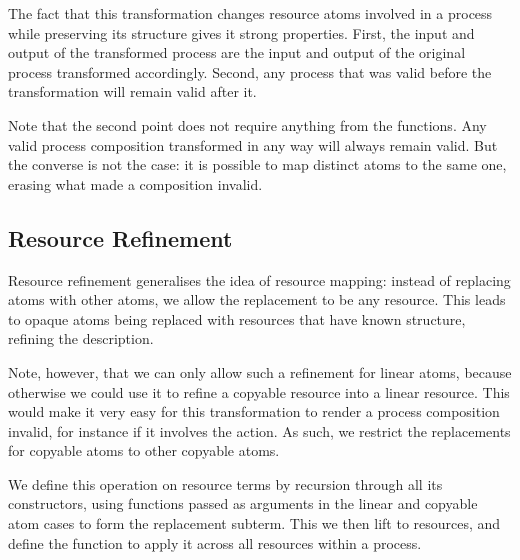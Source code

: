 \documentclass[class=smolathesis,crop=false]{standalone}
\begin{document}
The fact that this transformation changes resource atoms involved in a process while preserving its structure gives it strong properties.
First, the input and output of the transformed process are the input and output of the original process transformed accordingly.
Second, any process that was valid before the transformation will remain valid after it.

Note that the second point does not require anything from the functions.
Any valid process composition transformed in any way will always remain valid.
But the converse is not the case: it is possible to map distinct atoms to the same one, erasing what made a composition invalid.

\subsection{Resource Refinement}
\label{sec:proc/transform/res-refine}

Resource refinement generalises the idea of resource mapping: instead of replacing atoms with other atoms, we allow the replacement to be any resource.
This leads to opaque atoms being replaced with resources that have known structure, refining the description.

Note, however, that we can only allow such a refinement for linear atoms, because otherwise we could use it to refine a copyable resource into a linear resource.
This would make it very easy for this transformation to render a process composition invalid, for instance if it involves the  action.
As such, we restrict the replacements for copyable atoms to other copyable atoms.

We define this operation on resource terms by recursion through all its constructors, using functions passed as arguments in the linear and copyable atom cases to form the replacement subterm.
This we then lift to resources, and define the function  to apply it across all resources within a process.
\end{document}

